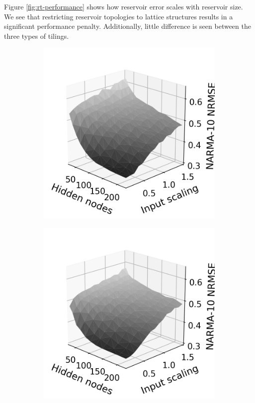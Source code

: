 Figure \ref{fig:rt-performance} shows how reservoir error scales with reservoir
size. We see that restricting reservoir topologies to lattice structures results
in a significant performance penalty. Additionally, little difference is seen
between the three types of tilings.

\begin{figure}[htb]
  \centering
  \begin{subfigure}{.32\textwidth}
    \centering
    \includegraphics[width=1.0\linewidth]{figures/regular-tilings-performance-is-sq.png}
    \caption{}
    \label{fig:rt-is-square}
  \end{subfigure}
  \begin{subfigure}{.32\textwidth}
    \centering
    \includegraphics[width=1.0\linewidth]{figures/regular-tilings-performance-is-hex.png}

\end{subfigure}
\end{figure}
